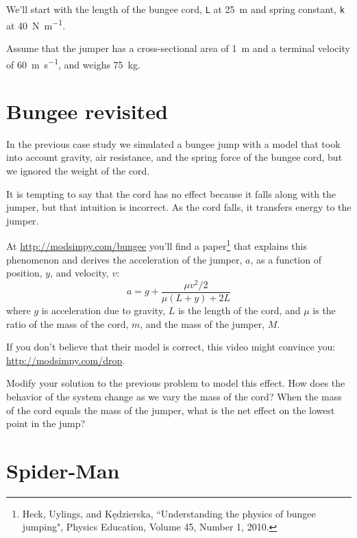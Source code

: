 \documentclass[
]{book}
\numberwithin{Answer}{chapter}
\numberwithin{Exercise}{chapter}
\begin{document}


We'll start with the length of the bungee cord, {\tt L} at \SI{25}{\meter} and spring constant, {\tt k} at \SI{40}{\newton \per \meter}.

Assume that the jumper has a cross-sectional area of \SI{1}{\meter} and a terminal velocity of \SI{60}{\meter\per\second}, and weighs \SI{75}{\kilogram}.


\section{Bungee revisited}


In the previous case study we simulated a bungee jump with a model that took into account gravity, air resistance, and the spring force of the bungee cord, but we ignored the weight of the cord.


It is tempting to say that the cord has no effect because it falls along with the jumper, but that intuition is incorrect.  As the cord falls, it transfers energy to the jumper.


At \url{http://modsimpy.com/bungee} you'll find a paper\footnote{Heck, Uylings, and Kędzierska, ``Understanding the physics of bungee jumping", Physics Education, Volume 45, Number 1, 2010.} that explains this phenomenon and derives the acceleration of the jumper, $a$, as a function of position, $y$, and velocity, $v$:
%
\[ a = g + \frac{\mu v^2/2}{\mu(L+y) + 2L} \] 
%
where $g$ is acceleration due to gravity, $L$ is the length of the cord, and $\mu$ is the ratio of the mass of the cord, $m$, and the mass of the jumper, $M$.

If you don't believe that their model is correct, this video might convince you: \url{http://modsimpy.com/drop}.

Modify your solution to the previous problem to model this effect.  How does the behavior of the system change as we vary the mass of the cord?  When the mass of the cord equals the mass of the jumper, what is the net effect on the lowest point in the jump?


\section{Spider-Man}
\end{document}
